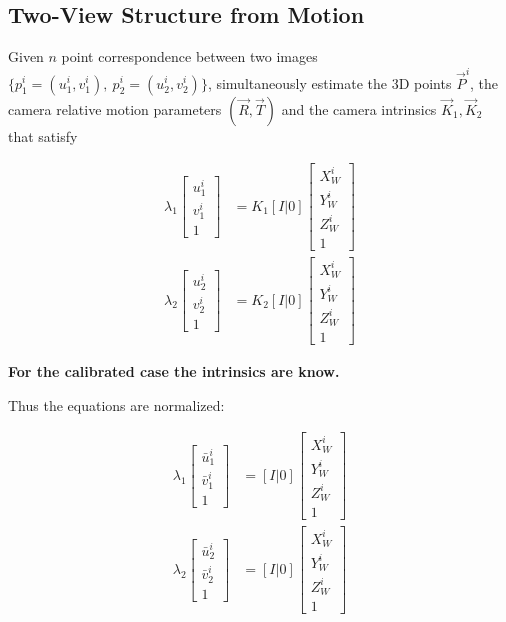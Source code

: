 \documentclass[10pt,a4paper]{scrartcl}
\begin{document}
\begin{multicols*}{2}
\section{Two-View Structure from Motion}

Given $n$ point correspondence between two images $\{p^i_1=(u^i_1,v^i_1),\ p^i_2 = (u^i_2,v^i_2)\}$, simultaneously estimate the 3D points $\vec{P}^i$, the camera relative motion parameters $(\vec{R},\vec{T})$ and the camera intrinsics $\vec{K}_1,\vec{K}_2$ that satisfy

\begin{align*}
\lambda_1\begin{bmatrix}u^i_1\\v^i_1\\1\end{bmatrix}&=K_1[I|0]\begin{bmatrix}
X^i_W\\Y^i_W\\Z^i_W\\1
\end{bmatrix}\\
\lambda_2\begin{bmatrix}u^i_2\\v^i_2\\1\end{bmatrix}&=K_2[I|0]\begin{bmatrix}
X^i_W\\Y^i_W\\Z^i_W\\1
\end{bmatrix}
\end{align*}

\textbf{For the calibrated case the intrinsics are know.}

Thus the equations are normalized:

\begin{align*}
\lambda_1\begin{bmatrix}\bar{u}^i_1\\\bar{v}^i_1\\1\end{bmatrix}&=[I|0]\begin{bmatrix}
X^i_W\\Y^i_W\\Z^i_W\\1
\end{bmatrix}\\
\lambda_2\begin{bmatrix}\bar{u}^i_2\\\bar{v}^i_2\\1\end{bmatrix}&=[I|0]\begin{bmatrix}
X^i_W\\Y^i_W\\Z^i_W\\1
\end{bmatrix}
\end{align*}


\end{multicols*}
\end{document}
